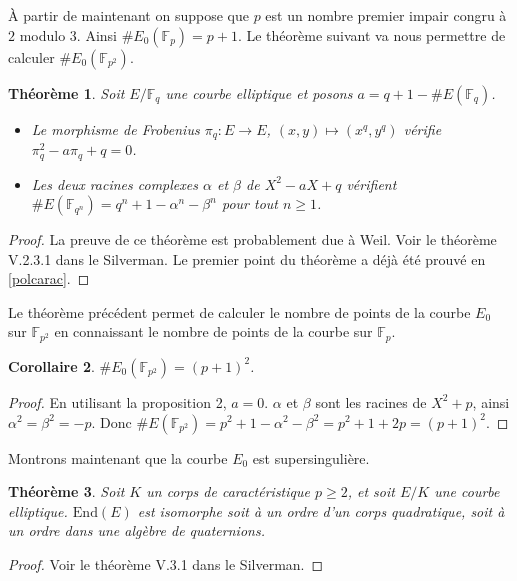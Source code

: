 \documentclass{article}
\theoremstyle{plain}%
\newtheorem{thm}{Théorème}[section]
\newtheorem{cor}[thm]{Corollaire}
\theoremstyle{definition}%
\newcommand{\F}{\mathbb{F}}
\begin{document}
À partir de maintenant on suppose que $p$ est un nombre premier impair congru à $2$ modulo $3$. 
Ainsi $\#E_0(\F_{p}) = p+1$. 
Le théorème suivant va nous permettre de calculer $\#E_0(\F_{p^2})$. 

\begin{thm}
  \label{weil}
  Soit $E/\F_q$ une courbe elliptique et posons $a = q + 1 - \#E(\F_q)$.
  \begin{itemize}
    \item Le morphisme de Frobenius $\pi_q \colon E \to E$, $(x, y) \mapsto (x^q, y^q)$ vérifie $\pi_q^2 - a\pi_q + q = 0$.
    \item Les deux racines complexes $\alpha$ et $\beta$ de $X^2 - aX + q$ vérifient $\#E(\F_{q^n}) = q^n + 1 - \alpha^n - \beta^n$ pour tout $n\ge1$. 
  \end{itemize}
\end{thm}

\begin{proof}
  La preuve de ce théorème est probablement due à Weil. Voir le théorème V.2.3.1 dans le Silverman. Le premier point du théorème a déjà été prouvé en \ref{polcarac}.
\end{proof}

Le théorème précédent permet de calculer le nombre de points de la courbe $E_0$ sur $\F_{p^2}$ en connaissant le nombre de points de la courbe sur $\F_{p}$.

\begin{cor}
$\#E_0(\F_{p^2}) = (p+1)^2$.
\end{cor}

\begin{proof}
  En utilisant la proposition 2, $a = 0$. $\alpha$ et $\beta$ sont les racines de $X^2 + p$, ainsi $\alpha^2 = \beta^2 = -p$. Donc $\#E(\F_{p^2}) = p^2 + 1 - \alpha^2 - \beta^2 = p^2 + 1 + 2p = (p+1)^2$.
\end{proof}


Montrons maintenant que la courbe $E_0$ est supersingulière.

\begin{thm}
  Soit $K$ un corps de caractéristique $p\ge 2$, et soit $E/K$ une courbe elliptique. $\mathrm{End}(E)$ est isomorphe soit à un ordre d'un corps quadratique, soit à un ordre dans une algèbre de quaternions. 
\end{thm}

\begin{proof}
  Voir le théorème V.3.1 dans le Silverman.
\end{proof}
\end{document}
